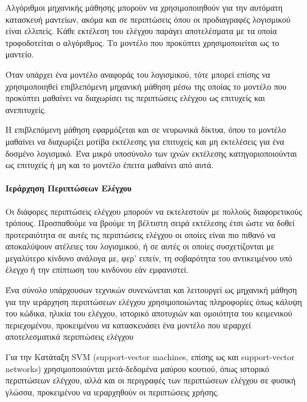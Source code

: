 \documentclass[12pt]{article}
\begin{document}
\par Αλγόριθμοι μηχανικής μάθησης μπορούν να χρησιμοποιηθούν για την αυτόματη κατασκευή μαντείων, ακόμα και σε περιπτώσεις όπου οι προδιαγραφές λογισμικού είναι ελλιπείς. Κάθε εκτέλεση του ελέγχου παράγει αποτελέσματα με τα οποία τροφοδοτείται ο αλγόριθμος. Το μοντέλο που προκύπτει χρησιμοποιείται ως το μαντείο.

\par Όταν υπάρχει ένα μοντέλο αναφοράς του λογισμικού, τότε μπορεί επίσης να χρησιμοποιηθεί επιβλεπόμενη μηχανική μάθηση μέσω της οποίας το μοντέλο που προκύπτει μαθαίνει να διαχωρίσει τις περιπτώσεις ελέγχου ως επιτυχείς και ανεπιτυχείς.

\par Η επιβλεπόμενη μάθηση εφαρμόζεται και σε νευρωνικά δίκτυα, όπου το μοντέλο μαθαίνει να διαχωρίζει μοτίβα εκτέλεσης για επιτυχείς και μη εκτελέσεις για ένα δοσμένο λογισμικό. Ένα μικρό υποσύνολο των ιχνών εκτέλεσης κατηγοριοποιούνται ως επιτυχείς ή μη και το μοντέλο έπειτα μαθαίνει από αυτά.

\paragraph{Ιεράρχηση Περιπτώσεων Ελέγχου}
Οι διάφορες περιπτώσεις ελέγχου μπορούν να εκτελεστούν με πολλούς διαφορετικούς τρόπους. Προσπαθούμε να βρούμε τη βέλτιστη σειρά εκτέλεσης έτσι ώστε να δοθεί προτεραιότητα σε αυτές τις περιπτώσεις ελέγχου οι οποίες είναι πιο πιθανό να αποκαλύψουν ατέλειες του λογισμικού, ή σε αυτές οι οποίες συσχετίζονται με μεγαλύτερο κίνδυνο ανάλογα με, φερ’ ειπείν, τη σοβαρότητα του αντικειμένου υπό έλεγχο ή την επίπτωση του κινδύνου εάν εμφανιστεί.
\par Ένα σύνολο υπάρχουσων τεχνικών συνενώνεται και λειτουργεί ως μηχανική μάθηση για την ιεράρχηση περιπτώσεων ελέγχου χρησιμοποιώντας πληροφορίες όπως κάλυψη του κώδικα, ηλικία του ελέγχου, ιστορικό αποτυχιών και ομοιότητα του κειμενικού περιεχομένου, προκειμένου να κατασκευάσει ένα μοντέλο που ιεραρχεί αποτελεσματικά περιπτώσεις ελέγχου
\par Για την Κατάταξη SVM (support-vector machines, επίσης ως και support-vector networks) χρησιμοποιούνται μετά-δεδομένα μαύρου κουτιού, όπως ιστορικό περιπτώσεων ελέγχου, αλλά και οι περιγραφές των περιπτώσεων ελέγχου σε φυσική γλώσσα, προκειμένου να ιεραρχηθούν οι περιπτώσεις χρήσης.
\end{document}
